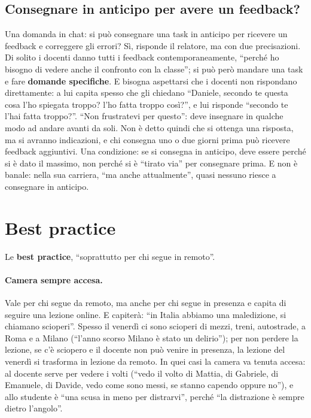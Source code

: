 \subsection{Consegnare in anticipo per avere un feedback?}

Una domanda in chat: si può consegnare una task in anticipo per ricevere un
feedback e correggere gli errori? Sì, risponde il relatore, ma con due
precisazioni. Di solito i docenti danno tutti i feedback contemporaneamente,
``perché ho bisogno di vedere anche il confronto con la classe''; si può
però mandare una task e fare \textbf{domande specifiche}. E bisogna
aspettarsi che i docenti non rispondano direttamente: a lui capita spesso
che gli chiedano ``Daniele, secondo te questa cosa l'ho spiegata troppo?
l'ho fatta troppo così?'', e lui risponde ``secondo te l'hai fatta
troppo?''. ``Non frustratevi per questo'': deve insegnare in qualche modo ad
andare avanti da soli. Non è detto quindi che si ottenga una risposta, ma si
avranno indicazioni, e chi consegna uno o due giorni prima può ricevere
feedback aggiuntivi. Una condizione: se si consegna in anticipo, deve
essere perché si è dato il massimo, non perché si è ``tirato via'' per
consegnare prima. E non è banale: nella sua carriera, ``ma anche
attualmente'', quasi nessuno riesce a consegnare in anticipo.

\section{Best practice}
\label{p1:sec:best}

Le \textbf{best practice}, ``soprattutto per chi segue in remoto''.

\paragraph{Camera sempre accesa.} Vale per chi segue da remoto, ma anche per
chi segue in presenza e capita di seguire una lezione online. E capiterà:
``in Italia abbiamo una maledizione, si chiamano scioperi''. Spesso il
venerdì ci sono scioperi di mezzi, treni, autostrade, a Roma e a Milano
(``l'anno scorso Milano è stato un delirio''); per non perdere la lezione,
se c'è sciopero e il docente non può venire in presenza, la lezione del
venerdì si trasforma in lezione da remoto. In quei casi la camera va tenuta
accesa: al docente serve per vedere i volti (``vedo il volto di Mattia, di
Gabriele, di Emanuele, di Davide, vedo come sono messi, se stanno capendo
oppure no''), e allo studente è ``una scusa in meno per distrarvi'', perché
``la distrazione è sempre dietro l'angolo''.

